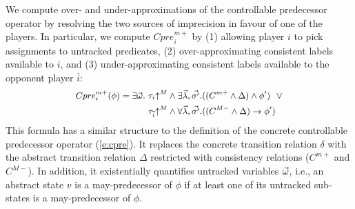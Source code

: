We compute over- and under-approximations of the controllable 
predecessor operator by resolving the two sources of imprecision 
in favour of one of the players.  In particular, we compute 
$Cpre_i^{m+}$ by (1) allowing player $i$ to pick assignments to 
untracked predicates, (2) over-approximating consistent labels 
available to $i$, and (3) under-approximating consistent labels 
available to the opponent player $\overline{i}$:
\begin{equation}
    \label{e:cprem}
    \small
\begin{aligned}
    Cpre_i^{m+}(\phi) = \exists \vec{\omega} .~&\tau_i\mathord{\uparrow^M}         \land \exists \vec{\lambda},\vec{\sigma'}. ((C^{m+} \land \Delta) \land \phi')
                                                 ~~\lor\\
                                                &\tau_{\overline{i}}\mathord{\uparrow^M} \land \forall \vec{\lambda},\vec{\sigma'}. ((C^{M-} \land\Delta) \rightarrow \phi')
\end{aligned}
\end{equation}
This formula has a similar structure to the definition of the 
concrete controllable predecessor operator (\ref{e:cpre}).  It 
replaces the concrete transition relation $\delta$ with the 
abstract transition relation $\Delta$ restricted with consistency 
relations ($C^{m+}$ and $C^{M-}$).  In addition, it existentially 
quantifies untracked variables $\vec{\omega}$, i.e., an abstract 
state $v$ is a may-predecessor of $\phi$ if at least one of its 
untracked sub-states is a may-predecessor of $\phi$.

